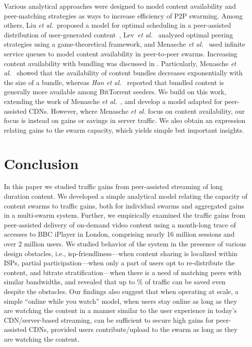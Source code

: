 \documentclass[10pt, conference, letterpaper]{IEEEtran}
\begin{document}
Various analytical approaches were designed to model content availability and peer-matching strategies as ways to increase efficiency of P2P swarming. Among others, Liu \textsl{et al.}\ proposed a model for optimal scheduling in a peer-assisted distribution of user-generated content~\cite{liu2012peer}, Lev~\textsl{et al.}~\cite{lev2010dynamic} analyzed optimal peering strategies using a game-theoretical framework, and Menasche \textsl{et al.}~\cite{menasche2013content} used infinite service queues to model content availability in peer-to-peer swarms. Increasing content availability with bundling was discussed in \cite{menasche2013content, kaune2010seeder, zhang2012dynamic, carlsson2010using, carlsson2012tradeoffs, han2012bundling}. Particularly, Menasche \textsl{et al.}~\cite{menasche2013content} showed that the availability of content bundles decreases exponentially with the size of a bundle, whereas \textsl{Han et al.}~\cite{han2012bundling} reported that bundled content is generally more available among BitTorrent seeders. We build on this work, extending the work of Menasche \textsl{et al.}~\cite{menasche2013content}, and develop a model adapted for peer-assisted CDNs. However, where Menasche \textsl{et al.} focus on content availability,  our focus is instead on gains or savings in server traffic. We also obtain an expression relating gains to the swarm capacity, which yields simple but important insights. 








%
 \vspace{4mm}
\section{Conclusion}

In this paper we studied traffic gains from peer-assisted streaming of long duration content. We  developed a simple analytical model relating the capacity of content swarms to traffic gains, both for individual swarms and aggregated gains in a multi-swarm system. Further, we empirically examined the traffic gains from peer-assisted delivery of on-demand video content using a month-long trace of accesses to BBC iPlayer in London, comprising nearly 16 million sessions and over 2 million users. We studied behavior of the system in the presence of various design obstacles, i.e., isp-friendliness---when content sharing is localized within ISPs, partial participation---when only a part of users opt to re-distribute the content, and bitrate stratification---when there is a need of matching peers with similar bandwidths, and revealed that up to \% of traffic can be saved even despite the obstacles. Our findings also suggest that when operating at scale, a simple ``online while you watch'' model, when users stay online as long as they are watching the content in a manner similar to the user experience in today's CDN/server-based streaming, can be sufficient to secure high gains for peer-assisted CDNs,  provided users contribute/upload to the swarm as long as they are watching the content. 
\end{document}
